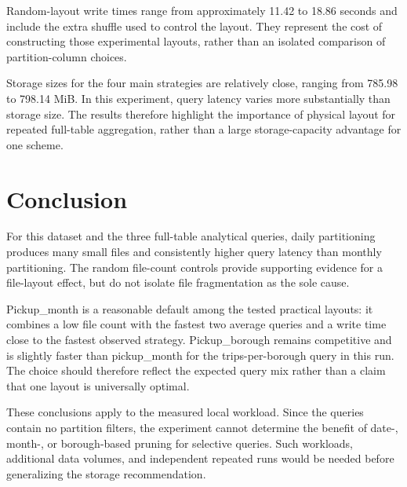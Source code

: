 \documentclass[a4paper,11pt]{article}
\begin{document}
Random-layout write times range from approximately 11.42 to 18.86 seconds and include the extra shuffle used to control the layout. They represent the cost of constructing those experimental layouts, rather than an isolated comparison of partition-column choices.

Storage sizes for the four main strategies are relatively close, ranging from 785.98 to 798.14 MiB. In this experiment, query latency varies more substantially than storage size. The results therefore highlight the importance of physical layout for repeated full-table aggregation, rather than a large storage-capacity advantage for one scheme.

\section{Conclusion}

For this dataset and the three full-table analytical queries, daily partitioning produces many small files and consistently higher query latency than monthly partitioning. The random file-count controls provide supporting evidence for a file-layout effect, but do not isolate file fragmentation as the sole cause.

Pickup\_month is a reasonable default among the tested practical layouts: it combines a low file count with the fastest two average queries and a write time close to the fastest observed strategy. Pickup\_borough remains competitive and is slightly faster than pickup\_month for the trips-per-borough query in this run. The choice should therefore reflect the expected query mix rather than a claim that one layout is universally optimal.

These conclusions apply to the measured local workload. Since the queries contain no partition filters, the experiment cannot determine the benefit of date-, month-, or borough-based pruning for selective queries. Such workloads, additional data volumes, and independent repeated runs would be needed before generalizing the storage recommendation.
\end{document}
